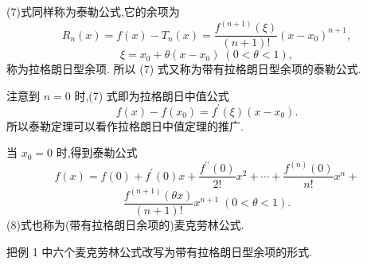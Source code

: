 (7)式同样称为泰勒公式,它的余项为
\[
{R}_{n}\left( x\right)  = f\left( x\right)  - {T}_{n}\left( x\right)  = \frac{{f}^{\left( n + 1\right) }\left( \xi \right) }{\left( {n + 1}\right) !}{\left( x - {x}_{0}\right) }^{n + 1},
\]
\[
\xi  = {x}_{0} + \theta \left( {x - {x}_{0}}\right) \;\left( {0 < \theta  < 1}\right) ,
\]
称为拉格朗日型余项. 所以 (7) 式又称为带有拉格朗日型余项的泰勒公式.

注意到 \(n = 0\) 时,(7) 式即为拉格朗日中值公式
\[
f\left( x\right)  - f\left( {x}_{0}\right)  = {f}^{\prime }\left( \xi \right) \left( {x - {x}_{0}}\right) .
\]
所以泰勒定理可以看作拉格朗日中值定理的推广.

当 \({x}_{0} = 0\) 时,得到泰勒公式
\[
f\left( x\right)  = f\left( 0\right)  + {f}^{\prime }\left( 0\right) x + \frac{{f}^{\prime \prime }\left( 0\right) }{2!}{x}^{2} + \cdots  + \frac{{f}^{\left( n\right) }\left( 0\right) }{n!}{x}^{n} +
\]
\[
\frac{{f}^{\left( n + 1\right) }\left( {\theta x}\right) }{\left( {n + 1}\right) !}{x}^{n + 1}\;\left( {0 < \theta  < 1}\right) . \tag{8}
\]
(8)式也称为(带有拉格朗日余项的)麦克劳林公式.

\begin{example}
把例 1 中六个麦克劳林公式改写为带有拉格朗日型余项的形式.
\end{example}


